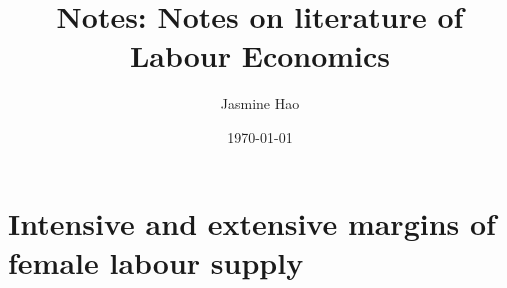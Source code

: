 \documentclass{report}
\title{Notes: Notes on literature of Labour Economics}
\author{Jasmine Hao}
\date{\today}
\begin{document}
\maketitle

\chapter{Intensive and extensive margins of female labour supply}



 

\end{document}
